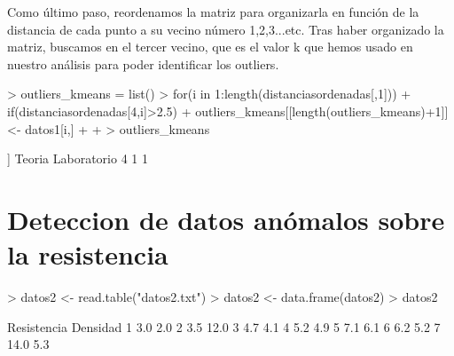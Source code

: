 \documentclass [a4paper] {article}
\begin{document}
Como último paso, reordenamos la matriz para organizarla en función de la distancia
de cada punto a su vecino número 1,2,3...etc. Tras haber organizado la matriz, buscamos en el tercer
vecino, que es el valor k que hemos usado en nuestro análisis para poder identificar los outliers.
\begin{Schunk}
\begin{Sinput}
> outliers_kmeans = list()
> for(i in 1:length(distanciasordenadas[,1])){
+   if(distanciasordenadas[4,i]>2.5){
+     outliers_kmeans[[length(outliers_kmeans)+1]] <- datos1[i,]
+   }
+ }
> outliers_kmeans
\end{Sinput}
\begin{Soutput}
[[1]]
  Teoria Laboratorio
4      1           1
\end{Soutput}
\end{Schunk}



\section{Deteccion de datos anómalos sobre la resistencia }

\begin{Schunk}
\begin{Sinput}
> datos2 <- read.table("datos2.txt")
> datos2 <- data.frame(datos2)
> datos2
\end{Sinput}
\begin{Soutput}
  Resistencia Densidad
1         3.0      2.0
2         3.5     12.0
3         4.7      4.1
4         5.2      4.9
5         7.1      6.1
6         6.2      5.2
7        14.0      5.3
\end{Soutput}
\end{Schunk}
\end{document}
